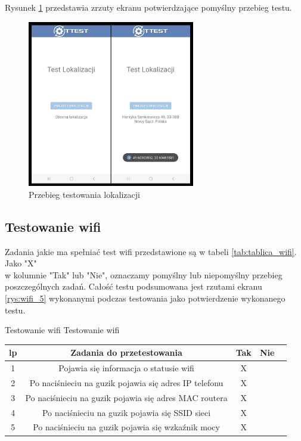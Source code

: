 Rysunek \ref{rys:gps_5} przedstawia zrzuty ekranu potwierdzające pomyślny przebieg testu.

\begin{figure}[!hbt]
	\begin{center}
		\includegraphics[angle=360, width=0.65\textwidth]{rys/punkt5/gps.jpg}
		\caption{Przebieg testowania lokalizacji}
		\label{rys:gps_5}
	\end{center}
\end{figure} 

\newpage


\subsection{Testowanie wifi}  

\hspace{0.60cm}Zadania jakie ma spełniać test wifi przedstawione są w tabeli \ref{tab:tablica_wifi}. Jako "X" \\ w kolumnie "Tak" lub "Nie", oznaczamy pomyślny lub niepomyślny przebieg poszczególnych zadań. Całość testu podsumowana jest rzutami ekranu \ref{rys:wifi_5} wykonanymi podczas testowania jako potwierdzenie wykonanego testu.

\begin{tabela}
	{Testowanie wifi}	%
	{Testowanie wifi}	%
	{
		\begin{tabular}{|c|c|c|c|c|} \hline
			\textbf{lp} & \textbf{Zadania do przetestowania} & \textbf{Tak} & \textbf{Nie} \\ \hline
			1 & Pojawia się informacja o statusie wifi & X & ~ \\ \hline
			2 & Po naciśnieciu na guzik pojawia się adres IP telefonu & X & ~ \\ \hline
			3 & Po naciśnieciu na guzik pojawia się adres MAC routera & X & ~ \\ \hline
			4 & Po naciśnieciu na guzik pojawia się SSID sieci & X & ~ \\ \hline
			5 & Po naciśnieciu na guzik pojawia się wzkaźnik mocy & X & ~ \\ \hline
	\end{tabular}	}
	\label{tab:tablica_wifi}
\end{tabela}

